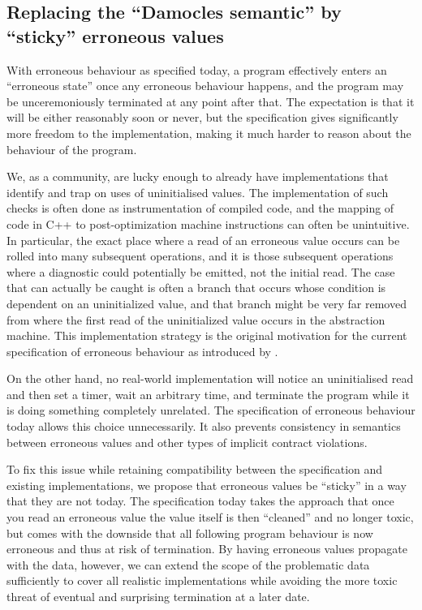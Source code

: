 \subsection{Replacing the ``Damocles semantic'' by ``sticky'' erroneous values}
\label{damocles}

With erroneous behaviour as specified today, a program effectively enters an ``erroneous state'' once any erroneous behaviour happens, and the program may be unceremoniously terminated at any point after that.  The expectation is that it will be either reasonably soon or never, but the specification gives significantly more freedom to the implementation, making it much harder to reason about the behaviour of the program.

We, as a community, are lucky enough to already have implementations that identify and trap on uses of uninitialised values.
 The implementation of such checks is often done as instrumentation of compiled code, and the mapping of code in C++ to post-optimization machine instructions can often be unintuitive.  In particular, the exact place where a read of an erroneous value occurs can be rolled into many subsequent operations, and it is those subsequent operations where a diagnostic could potentially be emitted, not the initial read.  The case that can actually be caught is often a branch that occurs whose condition is dependent on an uninitialized value, and that branch might be very far removed from where the first read of the uninitialized value occurs in the abstraction machine. 
This implementation strategy is the original motivation for the current specification of erroneous behaviour as introduced by \cite{P2795R5}.

On the other hand, no real-world implementation will notice an uninitialised read and then set a timer, wait an arbitrary time, and terminate the program while it is doing something completely unrelated.  The specification of erroneous behaviour today allows this choice unnecessarily. It also prevents consistency in semantics between erroneous values and other types of implicit contract violations.

To fix this issue while retaining compatibility between the specification and existing implementations, we propose that erroneous values be ``sticky'' in a way that they are not today.  The specification today takes the approach that once you read an erroneous value the value itself is then ``cleaned'' and no longer toxic, but comes with the downside that all following program behaviour is now erroneous and thus at risk of termination.    By having erroneous values propagate with the data, however, we can extend the scope of the problematic data sufficiently to cover all realistic implementations while avoiding the more toxic threat of eventual and surprising termination at a later date.

